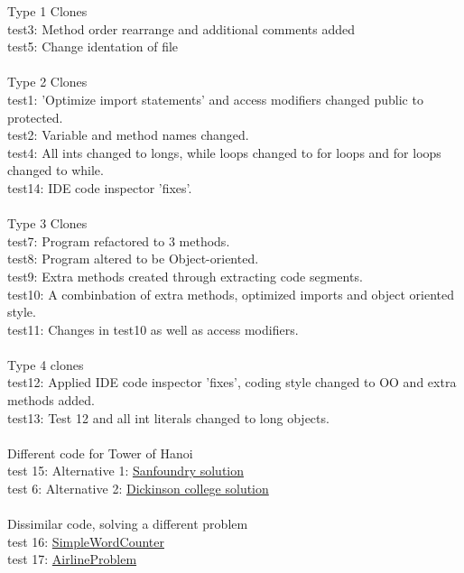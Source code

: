 \begin{tabbing}
Type 1 Clones\\
test3: Method order rearrange and additional comments added\\
test5: Change identation of file\\

\\Type 2 Clones\\
test1: 'Optimize import statements' and access modifiers changed public to protected.\\
test2: Variable and method names changed.\\
test4: All ints changed to longs, while loops changed to for loops and for loops changed to while.\\
test14: IDE code inspector 'fixes'.\\

\\Type 3 Clones\\
test7: Program refactored to 3 methods.\\
test8: Program altered to be Object-oriented.\\
test9: Extra methods created through extracting code segments.\\
test10: A combinbation of extra methods, optimized imports and object oriented style.\\
test11: Changes in test10 as well as access modifiers.\\

\\Type 4 clones\\
test12: Applied IDE code inspector 'fixes', coding style changed to OO and extra methods added.\\
test13: Test 12 and all int literals changed to long objects.\\

\\Different code for Tower of Hanoi\\
test 15: Alternative 1: \href{http://www.sanfoundry.com/java-program-implement-solve-tower-of-hanoi-using-stacks/}{Sanfoundry solution}\\
test 6: Alternative 2:
\href{http://users.dickinson.edu/~braught/courses/cs132s03/code/TowerOfHanoi.src.html}{Dickinson college solution}\\

\\Dissimilar code, solving a different problem\\
test 16: \href{http://www.cs.utexas.edu/~scottm/cs307/javacode/codeSamples/SimpleWordCounter.java}{SimpleWordCounter}\\
test 17: \href{http://www.cs.utexas.edu/~scottm/cs307/javacode/codeSamples/AirlineProblem.java}{AirlineProblem}\\
\end{tabbing}

 
\break



